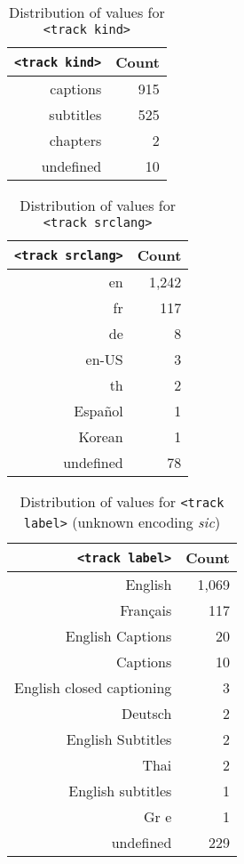 \documentclass{sig-alternate}
\makeatletter
\newcommand\unknown{%
  \sbox\Diam@nd{\raisebox{-1ex}{\scalebox{1}[1.2]{\rotatebox{45}{\rule{0.8em}{0.8em}}}}}%
  \makebox[\wd\Diam@nd]{\makebox[0pt]{\usebox\Diam@nd}\makebox[0pt]{\textcolor{white}{?}}}}
\makeatother
\begin{document}
\begin{table}[p]
  \centering
  \begin{tabular}{ r | r }                       
    \texttt{<track kind>} & Count \\
    \hline  
    captions & 915\\
    subtitles & 525\\
    chapters & 2\\
    undefined & 10\\  
  \end{tabular}
  \caption{Distribution of values for
    \texttt{<track kind>}}
  \label{table:kind}
\end{table}

\begin{table}[p]
  \centering
  \begin{tabular}{ r | r }                       
    \texttt{<track srclang>} & Count \\
    \hline  
    en & 1,242\\
    fr & 117\\
    de & 8\\    
    en-US & 3\\
    th & 2\\
    Español & 1\\
    Korean & 1\\
    undefined & 78\\    
  \end{tabular}
  \caption{Distribution of values for
    \texttt{<track srclang>}}
  \label{table:srclang}    
\end{table}

\begin{table}[p]
  \centering
  \begin{tabular}{ r | r }                       
    \texttt{<track label>} & Count \\
    \hline  
    English & 1,069\\
    Français & 117\\    
    English Captions & 20\\    
    Captions & 10\\
    English closed captioning & 3\\    
    Deutsch & 2\\    
    English Subtitles & 2\\
    Thai & 2\\    
    English subtitles & 1\\
    Gr\unknown\unknown e & 1\\
    undefined & 229\\
  \end{tabular}
  \caption{Distribution of values for
    \texttt{<track label>} \tiny (unknown encoding \emph{sic})}
  \label{table:label}    
\end{table}
  
\end{document}
